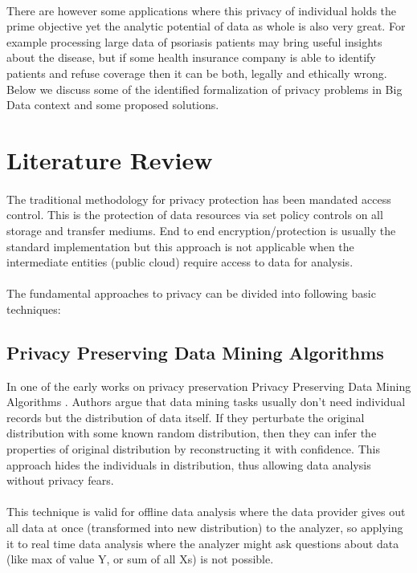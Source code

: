 \documentclass{report}
\begin{document}
\paragraph{}
There are however some applications where this privacy of individual holds the prime objective yet the analytic potential of data as whole is also very great. For example processing large data of psoriasis patients may bring useful insights about the disease, but if some health insurance company is able to identify patients and refuse coverage then it can be both, legally and ethically wrong. 
Below we discuss some of the identified formalization of privacy problems in Big Data context and some proposed solutions.

\section{Literature Review}
\paragraph{}
The traditional methodology for privacy protection has been mandated access control. This is the protection of data resources via set policy controls on all storage and transfer mediums. End to end encryption/protection is usually the standard implementation but this approach is not applicable when the intermediate entities (public cloud) require access to data for analysis.
\paragraph{}
The fundamental approaches to privacy can be divided into following basic techniques:
\subsection{Privacy Preserving Data Mining Algorithms}
In one of the early works on privacy preservation Privacy Preserving Data Mining Algorithms \cite{agrawal2001design}. Authors argue that data mining tasks usually don’t need individual records but the distribution of data itself. If they perturbate the original distribution with some known random distribution, then they can infer the properties of original distribution by reconstructing it with confidence. This approach hides the individuals in distribution, thus allowing data analysis without privacy fears.
\paragraph{}
This technique is valid for offline data analysis where the data provider gives out all data at once (transformed into new distribution) to the analyzer, so applying it to real time data analysis where the analyzer might ask questions about data (like max of value Y, or sum of all Xs) is not possible.
\end{document}
